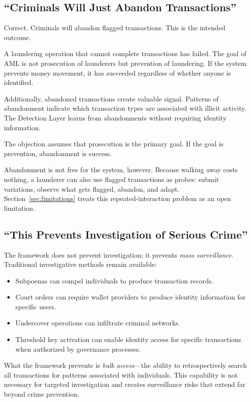 \documentclass[11pt]{article}
\begin{document}
\subsection{``Criminals Will Just Abandon Transactions''}

Correct. Criminals will abandon flagged transactions. This is the intended outcome.

A laundering operation that cannot complete transactions has failed. The goal of AML is not prosecution of launderers but prevention of laundering. If the system prevents money movement, it has succeeded regardless of whether anyone is identified.

Additionally, abandoned transactions create valuable signal. Patterns of abandonment indicate which transaction types are associated with illicit activity. The Detection Layer learns from abandonments without requiring identity information.

The objection assumes that prosecution is the primary goal. If the goal is prevention, abandonment is success.

Abandonment is not free for the system, however. Because walking away costs nothing, a launderer can also use flagged transactions as probes: submit variations, observe what gets flagged, abandon, and adapt. Section~\ref{sec:limitations} treats this repeated-interaction problem as an open limitation.

\subsection{``This Prevents Investigation of Serious Crime''}

The framework does not prevent investigation; it prevents \textit{mass surveillance}. Traditional investigative methods remain available:

\begin{itemize}
    \item Subpoenas can compel individuals to produce transaction records.
    \item Court orders can require wallet providers to produce identity information for specific users.
    \item Undercover operations can infiltrate criminal networks.
    \item Threshold key activation can enable identity access for specific transactions when authorized by governance processes.
\end{itemize}

What the framework prevents is \textit{bulk access}---the ability to retrospectively search all transactions for patterns associated with individuals. This capability is not necessary for targeted investigation and creates surveillance risks that extend far beyond crime prevention.
\end{document}
